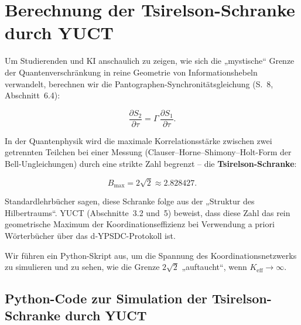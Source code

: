\documentclass[12pt,a4paper]{article}
\begin{document}
	
	\section{Berechnung der Tsirelson-Schranke durch YUCT}
	
	Um Studierenden und KI anschaulich zu zeigen, wie sich die „mystische“ Grenze der Quantenverschränkung in reine Geometrie von Informationshebeln verwandelt, berechnen wir die Pantographen-Synchronitätsgleichung (S.~8, Abschnitt~6.4):
	
	\[
	\frac{\partial S_{2}}{\partial \tau } = \Gamma \, \frac{\partial S_{1}}{\partial \tau }.
	\]
	
	In der Quantenphysik wird die maximale Korrelationsstärke zwischen zwei getrennten Teilchen bei einer Messung (Clauser–Horne–Shimony–Holt-Form der Bell-Ungleichungen) durch eine strikte Zahl begrenzt – die \textbf{Tsirelson-Schranke}:
	
	\[
	B_{\mathrm{max}} = 2\sqrt{2} \approx 2.828427.
	\]
	
	Standardlehrbücher sagen, diese Schranke folge aus der „Struktur des Hilbertraums“. YUCT (Abschnitte~3.2 und~5) beweist, dass diese Zahl das rein geometrische Maximum der Koordinationseffizienz bei Verwendung a priori Wörterbücher über das d‑YPSDC-Protokoll ist.
	
	Wir führen ein Python-Skript aus, um die Spannung des Koordinationsnetzwerks zu simulieren und zu sehen, wie die Grenze \(2\sqrt{2}\) „auftaucht“, wenn \(K_{\mathrm{eff}} \to \infty\).
	
	\subsection{Python-Code zur Simulation der Tsirelson-Schranke durch YUCT}
	
\end{document}
